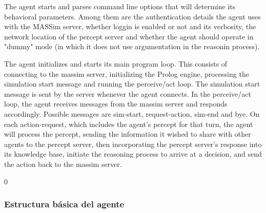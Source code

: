 
 The agent starts and parses command line options that will determine its behavioral parameters.
 Among them are the authentication details the agent uses with the MASSim server, 
 whether loggin is enabled or not and its verbosity, 
 the network location of the percept server 
 and whether the agent should operate in "dummy" mode (in which it does not use argumentation in the reasonin process).
 
 The agent initializes and starts its main program loop.
 This consists of connecting to the massim server, initializing the Prolog engine, processing the simulation start message and running the perceive/act loop. 
 The simulation start message is sent by the server whenever the agent connects.
 In the perceive/act loop, the agent receives messages from the massim server and responds accordingly.
 Possible messages are sim-start, request-action, sim-end and bye.
 On each action-request, which includes the agent's percept for that turn,
 the agent will process the percept, sending the information it wished to share with other agents to the percept server, then incorporating the percept server's response into its knowledge base, initiate the reasoning process to arrive at a decision, and send the action back to the massim server. 

0 \subsubsection{Estructura básica del agente}
 \label{subsub:estructura_basica_de_agente}
  
 
